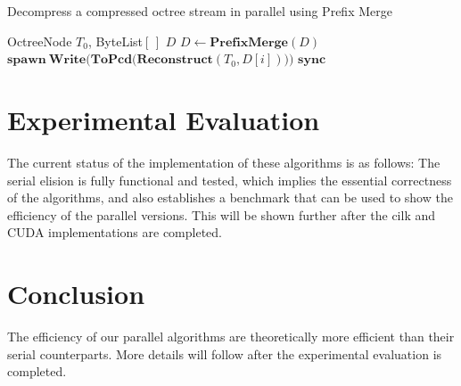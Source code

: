 \documentclass[twoside,twocolumn]{article}
\begin{document}
\begin{algorithm}[h]
\small
\caption{Decompress a compressed octree stream in parallel using Prefix Merge}
\label{alg:ParDecomp}
\begin{algorithmic}[1]
 {OctreeNode $T_0$, ByteList$[\,]$ $D$}
  \State $D \gets \mathbf{PrefixMerge}(D)$
    \State $\mathbf{spawn \ Write(ToPcd(Reconstruct}(T_0, D[i])))$
  \EndFor
  \State $\mathbf{sync}$
\EndProcedure
\Statex
\end{algorithmic}
\vspace{-0.4cm}
\end{algorithm}


\section{Experimental Evaluation} \label{sec:Experimental Evaluation}

The current status of the implementation of these algorithms is as follows: The serial
elision is fully functional and tested, which implies the essential correctness of the
algorithms, and also establishes a benchmark that can be used to show the efficiency of 
the parallel versions. This will be shown further after the cilk \cite{cilk} and CUDA
implementations are completed.


\section{Conclusion} \label{sec:Conclusion}

The efficiency of our parallel algorithms are theoretically more efficient than their
serial counterparts. More details will follow after the experimental evaluation is completed.

\end{document}
